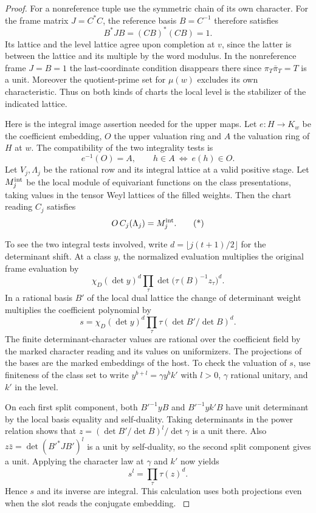 \begin{proof}
For a nonreference tuple use the symmetric chain of its
own character. For the frame matrix \(J=C^*C\), the reference basis \(B=C^{-1}\) therefore satisfies
\[
 B^*JB=(CB)^*(CB)=1.
\] Its lattice and the
level lattice agree upon completion at \(v\), since the latter
is between the lattice and its multiple by the word modulus.
In the nonreference frame \(J=B=1\) the last-coordinate
condition disappears there since \(\pi_T\bar\pi_T=T\) is a
unit. Moreover the quotient-prime set for \(\mu(w)\)
excludes its own characteristic. Thus on both kinds of charts
the local level is the stabilizer of the indicated lattice.
\label{cor:level-four-core-9}

Here is the integral image assertion needed for the upper maps.
Let \(e:H\to K_w\) be the coefficient embedding, \(O\) the upper valuation ring and \(A\) the valuation ring of \(H\) at \(w\). The compatibility of the two integrality tests is
\[
 e^{-1}(O)=A,\qquad h\in A\ \Longleftrightarrow\ e(h)\in O .
\]
Let \(V_j,\Lambda_j\) be the rational row and its integral
lattice at a valid positive stage. Let \(M_j^{\rm int}\) be
the local module of equivariant functions on the class
presentations, taking values in the tensor Weyl lattices of
the filled weights. Then the chart reading \(C_j\) satisfies
\[
                O\,C_j(\Lambda_j)=M_j^{\rm int}.
                \tag{*}\label{eq:core-upper-image}
\]

To see the two integral tests involved, write
\(d=\lfloor j(t+1)/2\rfloor\) for the determinant shift. At
a class \(y\), the normalized evaluation multiplies the
original frame evaluation by
\[
             \chi_D(\det y)^d\prod_\tau
                   \det\bigl(\tau(B)^{-1}z_\tau\bigr)^d .
\]
In a rational basis \(B'\) of the local dual lattice the change
of determinant weight multiplies the coefficient polynomial by
\[
             s=\chi_D(\det y)^d
                \prod_\tau\tau(\det B'/\det B)^d.
\]
The finite determinant-character values are rational over the
coefficient field by the marked character reading and its
values on uniformizers. The projections of the bases are
the marked embeddings of the host. To check the valuation of
\(s\), use finiteness of the class set to write
\(y^{b+l}=\gamma y^b k'\) with \(l>0\), \(\gamma\) rational
unitary, and \(k'\) in the level.

On each first split component,
both \(B'^{-1}yB\) and \(B'^{-1}yk'B\) have unit determinant
by the local basis equality and self-duality. Taking determinants
in the power relation shows that
\(z=(\det B'/\det B)^l/\det\gamma\) is a unit there.
Also \(z\bar z=\det(B'^*JB')^l\) is a unit by self-duality,
so the second split component gives a unit. Applying the character law at \(\gamma\) and \(k'\) now yields
\[
 s^l=\prod_\tau\tau(z)^d .
\] Hence \(s\) and its inverse are
integral. This calculation uses both projections even when the
slot reads the conjugate embedding. \label{cor:level-four-core-10}


\end{proof}
